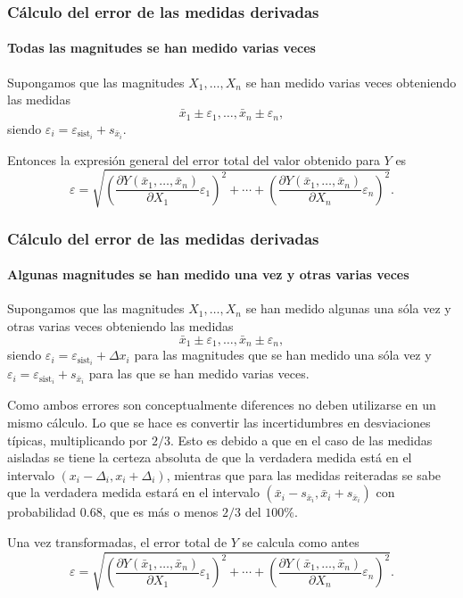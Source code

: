 \begin{frame}
\frametitle{Cálculo del error de las medidas derivadas}
\framesubtitle{Todas las magnitudes se han medido varias veces}
Supongamos que las magnitudes $X_1,\ldots,X_n$ se han medido varias veces obteniendo las medidas
\[
\bar x_1\pm \varepsilon_1,\ldots, \bar x_n\pm\varepsilon_n,
\] 
siendo $\varepsilon_i=\varepsilon_{\textrm{sist}_i}+s_{\bar x_i}$.

Entonces la expresión general del error total del valor obtenido para $Y$ es
\[
\varepsilon=\sqrt{\left(\frac{\partial Y(\bar x_1,\ldots,\bar x_n)}{\partial
X_1}\varepsilon_1\right)^2+\cdots+\left(\frac{\partial Y(\bar x_1,\ldots,\bar x_n)}{\partial
X_n}\varepsilon_n\right)^2}.
\]
\end{frame}


\begin{frame}
\frametitle{Cálculo del error de las medidas derivadas}
\framesubtitle{Algunas magnitudes se han medido una vez y otras varias veces}
Supongamos que las magnitudes $X_1,\ldots,X_n$ se han medido algunas una sóla vez y otras varias veces obteniendo las
medidas
\[
\bar x_1\pm \varepsilon_1,\ldots, \bar x_n\pm\varepsilon_n,
\] 
siendo $\varepsilon_i=\varepsilon_{\textrm{sist}_i}+\Delta x_i$ para
las magnitudes que se han medido una sóla vez y $\varepsilon_i=\varepsilon_{\textrm{sist}_i}+s_{\bar x_i}$ para las que
se han medido varias veces.

Como ambos errores son conceptualmente diferences no deben utilizarse en un mismo cálculo. Lo que se hace es convertir
las incertidumbres en desviaciones típicas, multiplicando por $2/3$. Esto es debido a que en el caso de las
medidas aisladas se tiene la certeza absoluta de que la verdadera medida está en el intervalo
$(x_i-\Delta_i,x_i+\Delta_i)$, mientras que para las medidas reiteradas se sabe que la verdadera medida estará en el
intervalo $(\bar x_i-s_{\bar x_i},\bar x_i+s_{\bar x_i})$ con probabilidad $0.68$, que es más o menos $2/3$ del
$100\%$.

Una vez transformadas, el error total de $Y$ se calcula como antes
\[
\varepsilon=\sqrt{\left(\frac{\partial Y(\bar x_1,\ldots,\bar x_n)}{\partial
X_1}\varepsilon_1\right)^2+\cdots+\left(\frac{\partial Y(\bar x_1,\ldots,\bar x_n)}{\partial
X_n}\varepsilon_n\right)^2}.
\]
\end{frame}


